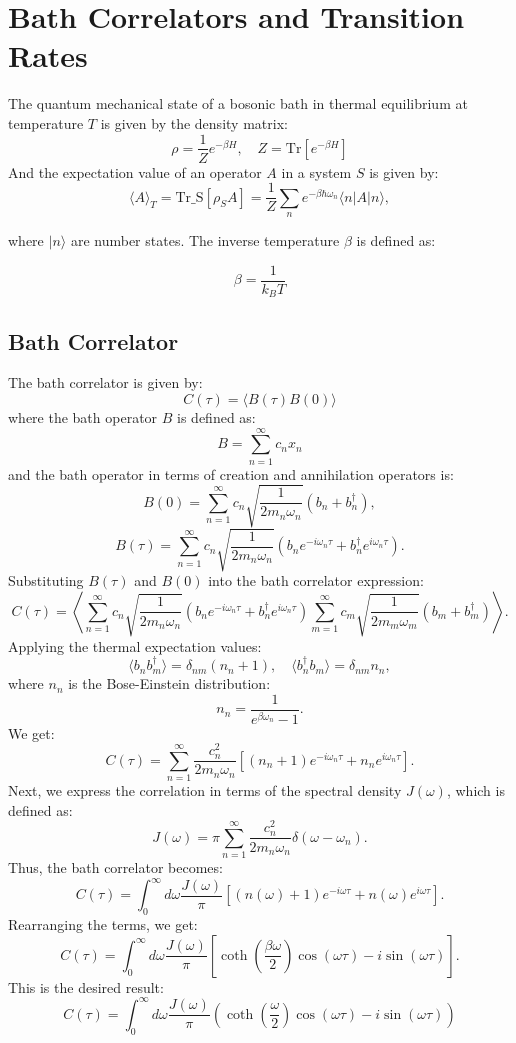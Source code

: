 \newpage
\section{Bath Correlators and Transition Rates}
The quantum mechanical state of a bosonic bath in thermal equilibrium at temperature \( T \) is given by the density matrix:
\[
\rho = \frac{1}{Z} e^{-\beta H}, \quad Z = \text{Tr}\left[e^{-\beta H}\right]
\]
And the expectation value of an operator \( A \) in a system \( S \) is given by:
\[
\langle A \rangle_T = \text{Tr_S}[\rho_S A] = \frac{1}{Z} \sum_n e^{-\beta \hbar \omega_n} \langle n | A | n \rangle,
\]

where \(|n\rangle\) are number states. 
The inverse temperature \(\beta\) is defined as:

\[
\beta = \frac{1}{k_B T}
\]

\subsection{Bath Correlator}

The bath correlator is given by:
\[
C(\tau) = \langle B(\tau) B(0) \rangle
\]
where the bath operator \( B \) is defined as:
\[
B = \sum_{n=1}^{\infty} c_n x_n
\]
and the bath operator in terms of creation and annihilation operators is:
\[
B(0) = \sum_{n=1}^{\infty} c_n \sqrt{\frac{1}{2 m_n \omega_n}} (b_n + b_n^\dagger),
\]
\[
B(\tau) = \sum_{n=1}^{\infty} c_n \sqrt{\frac{1}{2 m_n \omega_n}} \left( b_n e^{-i \omega_n \tau} + b_n^\dagger e^{i \omega_n \tau} \right).
\]
Substituting \( B(\tau) \) and \( B(0) \) into the bath correlator expression:
\[
C(\tau) = \left\langle \sum_{n=1}^{\infty} c_n \sqrt{\frac{1}{2 m_n \omega_n}} (b_n e^{-i \omega_n \tau} + b_n^\dagger e^{i \omega_n \tau}) \sum_{m=1}^{\infty} c_m \sqrt{\frac{1}{2 m_m \omega_m}} (b_m + b_m^\dagger) \right\rangle.
\]
Applying the thermal expectation values:
\[
\langle b_n b_m^\dagger \rangle = \delta_{nm} (n_n + 1), \quad \langle b_n^\dagger b_m \rangle = \delta_{nm} n_n,
\]
where \( n_n \) is the Bose-Einstein distribution:
\[
n_n = \frac{1}{e^{\beta \omega_n} - 1}.
\]
We get:
\[
C(\tau) = \sum_{n=1}^{\infty} \frac{c_n^2}{2 m_n \omega_n} \left[ (n_n + 1) e^{-i \omega_n \tau} + n_n e^{i \omega_n \tau} \right].
\]
Next, we express the correlation in terms of the spectral density \( J(\omega) \), which is defined as:
\[
J(\omega) = \pi \sum_{n=1}^{\infty} \frac{c_n^2}{2 m_n \omega_n} \delta(\omega - \omega_n).
\]
Thus, the bath correlator becomes:
\[
C(\tau) = \int_0^\infty d\omega \frac{J(\omega)}{\pi} \left[ (n(\omega) + 1) e^{-i \omega \tau} + n(\omega) e^{i \omega \tau} \right].
\]
Rearranging the terms, we get:
\[
C(\tau) = \int_0^\infty d\omega \frac{J(\omega)}{\pi} \left[ \coth\left( \frac{\beta \omega}{2} \right) \cos(\omega \tau) - i \sin(\omega \tau) \right].
\]
This is the desired result:
\[
C(\tau) = \int_0^\infty d\omega \frac{J(\omega)}{\pi} \left( \coth\left( \frac{\omega}{2} \right) \cos(\omega \tau) - i \sin(\omega \tau) \right)
\]





